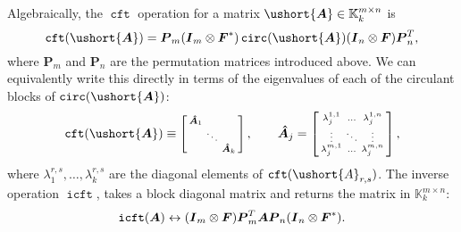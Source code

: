 \documentclass[1p,authoryear,letterpaper]{elsarticle}
\DeclareMathOperator{\tcirc}{\texttt{circ}}
\providecommand{\eqdef}{\equiv}
\providecommand{\KK}{\mathbb{K}}
\providecommand{\sbmat}[1]{\left[\begin{smallmatrix} #1 \end{smallmatrix}\right]}
\providecommand{\mat}{\boldsymbol}
\providecommand{\eye}{\mat{I}}
\providecommand{\mA}{\ensuremath{\mat{A}}}
\providecommand{\mF}{\ensuremath{\mat{F}}}
\providecommand{\mP}{\ensuremath{\mat{P}}}
\providecommand{\mhat}[1]{\ensuremath{\mat{\hat{#1}}}}
\providecommand{\mAhat}{\mhat{A}}
\DeclareMathOperator{\fft}{\texttt{cft}}
\DeclareMathOperator{\ifft}{\texttt{icft}}
\renewcommand{\circeq}{\leftrightarrow}
\newcommand{\cel}[1]{\ushort{#1}}
\newcommand{\celm}[1]{\cel{\mat{#1}}}
\newcommand{\cA}{\ensuremath{\cel{A}}}
\providecommand{\cmA}{\ensuremath{\celm{A}}}
\begin{document}
Algebraically, the $\fft$ operation for a matrix $\cmA \in \KK_k^{m \times n}$ is
\[ \fft(\cmA) = \mP_m (\eye_m \kron \mF^*) \tcirc(\cmA) (\eye_n \kron \mF) \mP_n^T, \]
where $\mP_m$ and $\mP_n$ are the permutation matrices introduced
above.
We can equivalently write this directly in terms of the
eigenvalues of each of the circulant blocks of $\tcirc(\cmA)$:
\[ \fft(\cmA) \eqdef \sbmat{ \mAhat_1 \\ & \ddots \\ & & \mAhat_k },
    \qquad
    \mAhat_j =
      \sbmat{ \lambda_j^{1,1} & \ldots & \lambda_j^{1,n} \\
              \vdots & \ddots & \vdots \\
              \lambda_j^{m,1} & \ldots & \lambda_j^{m,n} }, \]
where $\lambda_1^{r,s}, \ldots, \lambda_k^{r,s}$ are the diagonal
elements of $\fft(\cA_{r,s})$.
The inverse operation $\ifft$, takes a block diagonal matrix and returns
the matrix in $\KK_k^{m \times n}$:
\[ \ifft(\mA) \circeq (\eye_m \kron \mF) \mP_m^T \mA \mP_n (\eye_n \kron \mF^*). \]
\end{document}
